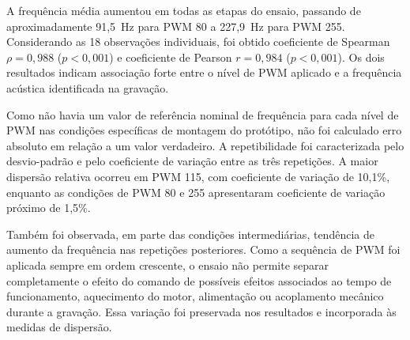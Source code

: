 \begin{table}[!htbp]
\centering
\caption{Frequência acústica associada ao funcionamento do motor para diferentes valores PWM}
\label{tab:frequencia_pwm}
\end{table}

A frequência média aumentou em todas as etapas do ensaio, passando de aproximadamente 91,5~Hz para PWM 80 a 227,9~Hz para PWM 255. Considerando as 18 observações individuais, foi obtido coeficiente de Spearman $\rho=0{,}988$ ($p<0{,}001$) e coeficiente de Pearson $r=0{,}984$ ($p<0{,}001$). Os dois resultados indicam associação forte entre o nível de PWM aplicado e a frequência acústica identificada na gravação.

Como não havia um valor de referência nominal de frequência para cada nível de PWM nas condições específicas de montagem do protótipo, não foi calculado erro absoluto em relação a um valor verdadeiro. A repetibilidade foi caracterizada pelo desvio-padrão e pelo coeficiente de variação entre as três repetições. A maior dispersão relativa ocorreu em PWM 115, com coeficiente de variação de 10,1\%, enquanto as condições de PWM 80 e 255 apresentaram coeficiente de variação próximo de 1,5\%.

Também foi observada, em parte das condições intermediárias, tendência de aumento da frequência nas repetições posteriores. Como a sequência de PWM foi aplicada sempre em ordem crescente, o ensaio não permite separar completamente o efeito do comando de possíveis efeitos associados ao tempo de funcionamento, aquecimento do motor, alimentação ou acoplamento mecânico durante a gravação. Essa variação foi preservada nos resultados e incorporada às medidas de dispersão.

